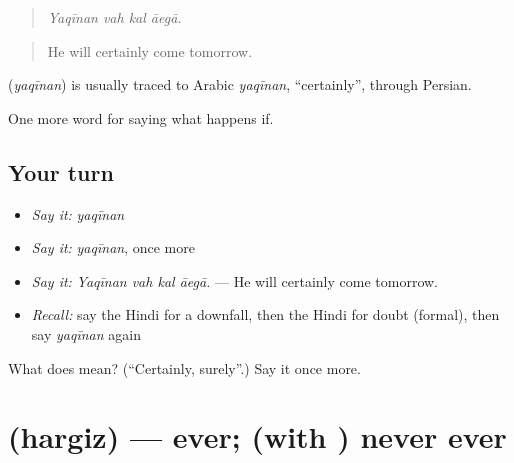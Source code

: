 \begin{quote}
   
\end{quote}

\begin{quote}
\emph{Yaqīnan vah kal āegā.}
\end{quote}

\begin{quote}
He will certainly come tomorrow.
\end{quote}

\begin{cousinweb}
\textbf{} (\emph{yaqīnan}) is usually traced to Arabic \emph{yaqīnan}, \textquotedblleft{}certainly\textquotedblright{}, through Persian.
\end{cousinweb}

\begin{grammarlens}[title={What you've built}]
One more word for saying what happens if.
\end{grammarlens}

\subsection*{Your turn}
\begin{itemize}
\raggedright
  \item \emph{Say it:} \emph{yaqīnan}
  \item \emph{Say it:} \emph{yaqīnan}, once more
  \item \emph{Say it:} \emph{Yaqīnan vah kal āegā.} — He will certainly come tomorrow.
  \item \emph{Recall:} say the Hindi for a downfall, then the Hindi for doubt (formal), then say \emph{yaqīnan} again
\end{itemize}

\begin{tcolorbox}[breakable,colback=teal!4,colframe=teal!35!black,title={Before you move on}]
What does  mean? (\textquotedblleft{}Certainly, surely\textquotedblright{}.) Say it once more.
\end{tcolorbox}
\section[\texorpdfstring{\hi{हरगिज़} (hargiz)}{हरगिज़ (hargiz)}]{ (hargiz) — ever; (with ) never ever}

\label{lesson:HI-C556-hargiz}



